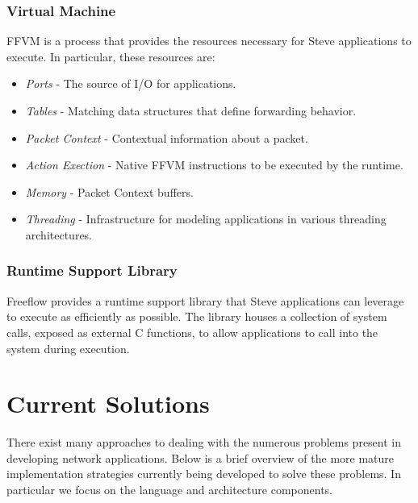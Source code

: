 \subsubsection{Virtual Machine}
FFVM is a process that provides the resources necessary for Steve applications
to execute. In particular, these resources are:

\begin{itemize}
\item \emph{Ports} - The source of I/O for applications.
\item \emph{Tables} - Matching data structures that define forwarding behavior.
\item \emph{Packet Context} - Contextual information about a packet.
\item \emph{Action Exection} - Native FFVM instructions to be executed by the runtime.
\item \emph{Memory} - Packet Context buffers.
\item \emph{Threading} - Infrastructure for modeling applications in various threading architectures.
\end{itemize}

\subsubsection{Runtime Support Library}
Freeflow provides a runtime support library that Steve applications can leverage to execute as efficiently as possible. The library houses a collection
of system calls, exposed as external C functions, to allow applications to call
into the system during execution.

\section{Current Solutions}
There exist many approaches to dealing with the numerous problems present in
developing network applications. Below is a brief overview of the more mature implementation strategies currently being developed to solve these problems. In
particular we focus on the language and architecture components.

